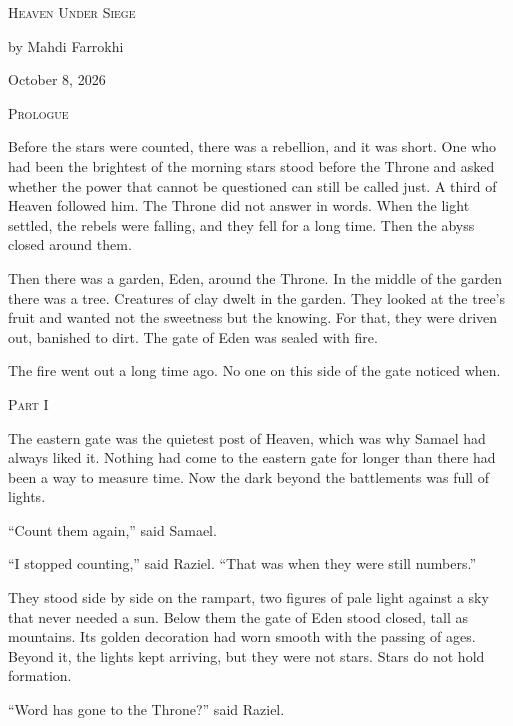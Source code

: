 \documentclass[11pt]{article}
\newcommand{\storypart}[1]{%
\clearpage
\vspace*{3\baselineskip}
\begin{center}
{\Large\scshape #1\par}
\end{center}
\vspace{2\baselineskip}
}
\begin{document}
\begin{titlepage}
\centering
\vspace*{\fill}
{\Huge\scshape Heaven Under Siege\par}
\vspace{3\baselineskip}
{\large by Mahdi Farrokhi\par}
\vspace{2\baselineskip}
{\normalsize October 8, 2026\par}
\vspace*{\fill}
\end{titlepage}

\storypart{Prologue}

Before the stars were counted, there was a rebellion, and it was short. One who had been the brightest of the morning stars stood before the Throne and asked whether the power that cannot be questioned can still be called just. A third of Heaven followed him. The Throne did not answer in words. When the light settled, the rebels were falling, and they fell for a long time. Then the abyss closed around them.

Then there was a garden, Eden, around the Throne. In the middle of the garden there was a tree. Creatures of clay dwelt in the garden. They looked at the tree's fruit and wanted not the sweetness but the knowing. For that, they were driven out, banished to dirt. The gate of Eden was sealed with fire.

The fire went out a long time ago. No one on this side of the gate noticed when.

\storypart{Part I}

The eastern gate was the quietest post of Heaven, which was why Samael had always liked it. Nothing had come to the eastern gate for longer than there had been a way to measure time. Now the dark beyond the battlements was full of lights.

``Count them again,'' said Samael.

``I stopped counting,'' said Raziel. ``That was when they were still numbers.''

They stood side by side on the rampart, two figures of pale light against a sky that never needed a sun. Below them the gate of Eden stood closed, tall as mountains. Its golden decoration had worn smooth with the passing of ages. Beyond it, the lights kept arriving, but they were not stars. Stars do not hold formation.

``Word has gone to the Throne?'' said Raziel.
\end{document}
